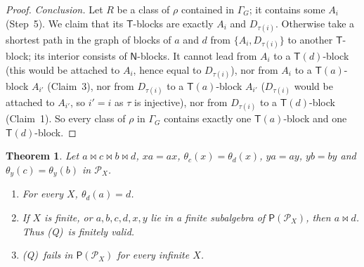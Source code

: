 \documentclass[11pt]{amsart}
\newtheorem{theorem}{Theorem}[section]
\theoremstyle{definition}
\renewcommand{\P}{\mathcal{P}}      %
\newcommand{\PA}{\mathsf{P}}         %
\newcommand{\T}{\mathsf{T}}
\newcommand{\N}{\mathsf{N}}
\newcommand{\mt}{\bowtie}      %
\newcommand{\Qcond}{\textup{(Q)}}
\begin{document}
\begin{proof}
\emph{Conclusion.} Let $R$ be a class of $\rho$ contained in $\Gamma_G$; it contains some $A_i$ (Step~5). We claim that its $\T$-blocks are exactly $A_i$ and $D_{\tau(i)}$. Otherwise take a shortest path in the graph of blocks of $a$ and $d$ from $\{A_i,D_{\tau(i)}\}$ to another $\T$-block; its interior consists of $\N$-blocks. It cannot lead from $A_i$ to a $\T(d)$-block (this would be attached to $A_i$, hence equal to $D_{\tau(i)}$), nor from $A_i$ to a $\T(a)$-block $A_{i'}$ (Claim~3), nor from $D_{\tau(i)}$ to a $\T(a)$-block $A_{i'}$ ($D_{\tau(i)}$ would be attached to $A_{i'}$, so $i'=i$ as $\tau$ is injective), nor from $D_{\tau(i)}$ to a $\T(d)$-block (Claim~1). So every class of $\rho$ in $\Gamma_G$ contains exactly one $\T(a)$-block and one $\T(d)$-block.
\end{proof}

\begin{theorem}\label{thm:Q}
Let $a\mt c\mt b\mt d$, $xa=ax$, $\theta_c(x)=\theta_d(x)$, $ya=ay$, $yb=by$ and $\theta_y(c)=\theta_y(b)$ in $\P_X$.
\begin{enumerate}[label=\textup{(\alph*)},nosep]
\item For every $X$, $\theta_d(a)=d$.
\item If $X$ is finite, or $a,b,c,d,x,y$ lie in a finite subalgebra of $\PA(\P_X)$, then $a\mt d$. Thus \Qcond\ is finitely valid.
\item \Qcond\ fails in $\PA(\P_X)$ for every infinite $X$.
\end{enumerate}
\end{theorem}
\end{document}
